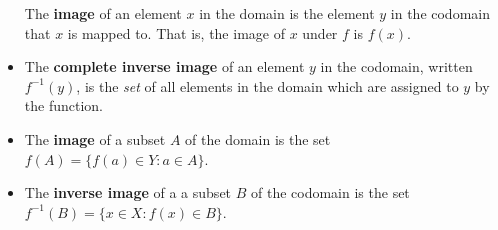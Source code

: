 \documentclass[10pt,]{book}
\newcommand{\terminology}[1]{\textbf{#1}}
\theoremstyle{plain}
\theoremstyle{definition}
\theoremstyle{definition}
\theoremstyle{definition}
\theoremstyle{definition}
\numberwithin{equation}{chapter}
\def\inv{^{-1}}
\def\st{:}
\begin{document}
\begin{assemblage}
\begin{itemize}[label=\textbullet]
The \terminology{image} of an element \(x\) in the domain is the element \(y\) in the codomain that \(x\) is mapped to.  That is, the image of \(x\) under \(f\) is  \(f(x)\).%
\item{}\hypertarget{p-1783}{}%
The \terminology{complete inverse image} of an element \(y\) in the codomain, written \(f\inv(y)\), is the \emph{set} of all elements in the domain which are assigned to \(y\) by the function.%
\item{}\hypertarget{p-1784}{}%
The \terminology{image} of a subset \(A\) of the domain is the set \(f(A) = \{f(a) \in Y \st a \in A\}\).%
\item{}\hypertarget{p-1785}{}%
The \terminology{inverse image} of a a subset \(B\) of the codomain is the set \(f\inv(B) = \{x \in X \st f(x) \in B\}\).%
\end{itemize}
%
\end{assemblage}
\typeout{************************************************}
\typeout{************************************************}
\end{document}
